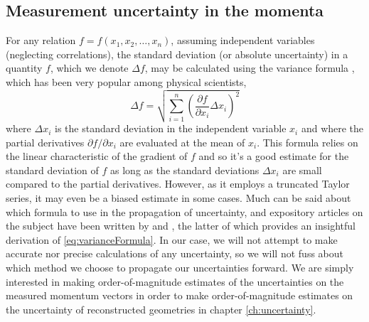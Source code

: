 \subsection{Measurement uncertainty in the momenta} \label{ssec:measurementUncertainty}
For any relation $f = f(x_1, x_2, \dots, x_n)$, assuming independent variables (neglecting correlations), the standard deviation (or absolute uncertainty) in a quantity $f$, which we denote $\Delta f$, may be calculated using the variance formula \citep{Ku66}, which has been very popular among physical scientists,
\begin{equation} \label{eq:varianceFormula}
\Delta f = \sqrt{\sum_{i=1}^{n} \left( \frac{\partial f}{\partial x_i} \Delta x_i \right)^2}
\end{equation}
where $\Delta x_i$ is the standard deviation in the independent variable $x_i$ and where the partial derivatives $\partial f/\partial x_i$ are evaluated at the mean of $x_i$. This formula relies on the linear characteristic of the gradient of $f$ and so it's a good estimate for the standard deviation of $f$ as long as the standard deviations $\Delta x_i$ are small compared to the partial derivatives. However, as it employs a truncated Taylor series, it may even be a biased estimate in some cases. Much can be said about which formula to use in the propagation of uncertainty, and expository articles on the subject have been written by \citet{Birge39} and \citet{Ku66}, the latter of which provides an insightful derivation of \eqref{eq:varianceFormula}. In our case, we will not attempt to make accurate nor precise calculations of any uncertainty, so we will not fuss about which method we choose to propagate our uncertainties forward. We are simply interested in making order-of-magnitude estimates of the uncertainties on the measured momentum vectors in order to make order-of-magnitude estimates on the uncertainty of reconstructed geometries in chapter \ref{ch:uncertainty}.

